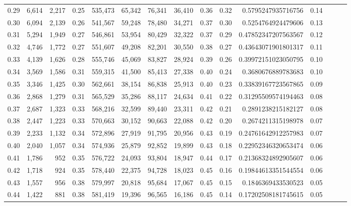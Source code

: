 \begin{tabular}{rrrrrrrrrrrrrrr}
0.29 &   6,614 &  2,217 &  0.25 &  535,473 &   65,342 &   76,341 &   36,410 &  0.36 &  0.32 &      0.5795247935716756 &      0.14 \\
0.30 &   6,094 &  2,139 &  0.26 &  541,567 &   59,248 &   78,480 &   34,271 &  0.37 &  0.30 &      0.5254764924479606 &      0.13 \\
0.31 &   5,294 &  1,949 &  0.27 &  546,861 &   53,954 &   80,429 &   32,322 &  0.37 &  0.29 &     0.47852347207563567 &      0.12 \\
0.32 &   4,746 &  1,772 &  0.27 &  551,607 &   49,208 &   82,201 &   30,550 &  0.38 &  0.27 &     0.43643071901801317 &      0.11 \\
0.33 &   4,139 &  1,626 &  0.28 &  555,746 &   45,069 &   83,827 &   28,924 &  0.39 &  0.26 &     0.39972151023050795 &      0.10 \\
0.34 &   3,569 &  1,586 &  0.31 &  559,315 &   41,500 &   85,413 &   27,338 &  0.40 &  0.24 &      0.3680676889783683 &      0.10 \\
0.35 &   3,346 &  1,425 &  0.30 &  562,661 &   38,154 &   86,838 &   25,913 &  0.40 &  0.23 &     0.33839167723567865 &      0.09 \\
0.36 &   2,868 &  1,279 &  0.31 &  565,529 &   35,286 &   88,117 &   24,634 &  0.41 &  0.22 &     0.31295509574194463 &      0.08 \\
0.37 &   2,687 &  1,323 &  0.33 &  568,216 &   32,599 &   89,440 &   23,311 &  0.42 &  0.21 &      0.2891238215182127 &      0.08 \\
0.38 &   2,447 &  1,223 &  0.33 &  570,663 &   30,152 &   90,663 &   22,088 &  0.42 &  0.20 &      0.2674211315198978 &      0.07 \\
0.39 &   2,233 &  1,132 &  0.34 &  572,896 &   27,919 &   91,795 &   20,956 &  0.43 &  0.19 &     0.24761642912257983 &      0.07 \\
0.40 &   2,040 &  1,057 &  0.34 &  574,936 &   25,879 &   92,852 &   19,899 &  0.43 &  0.18 &     0.22952346320653474 &      0.06 \\
0.41 &   1,786 &    952 &  0.35 &  576,722 &   24,093 &   93,804 &   18,947 &  0.44 &  0.17 &     0.21368324892905607 &      0.06 \\
0.42 &   1,718 &    924 &  0.35 &  578,440 &   22,375 &   94,728 &   18,023 &  0.45 &  0.16 &     0.19844613351544554 &      0.06 \\
0.43 &   1,557 &    956 &  0.38 &  579,997 &   20,818 &   95,684 &   17,067 &  0.45 &  0.15 &      0.1846369433530523 &      0.05 \\
0.44 &   1,422 &    881 &  0.38 &  581,419 &   19,396 &   96,565 &   16,186 &  0.45 &  0.14 &     0.17202508181745615 &      0.05 \\

\end{tabular}
